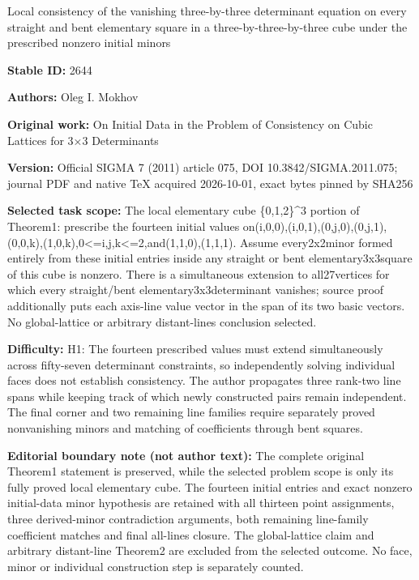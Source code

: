 \documentclass[11pt]{article}
\begin{document}
\begin{center}\Large Local consistency of the vanishing three-by-three determinant equation on every straight and bent elementary square in a three-by-three-by-three cube under the prescribed nonzero initial minors\end{center}
\noindent\textbf{Stable ID:} 2644\par
\noindent\textbf{Authors:} Oleg I. Mokhov\par
\noindent\textbf{Original work:} On Initial Data in the Problem of Consistency on Cubic Lattices for 3×3 Determinants\par
\noindent\textbf{Version:} Official SIGMA 7 (2011) article 075, DOI 10.3842/SIGMA.2011.075; journal PDF and native TeX acquired 2026-10-01, exact bytes pinned by SHA256\par
\noindent\textbf{Selected task scope:} The local elementary cube \{0,1,2\}\textasciicircum{}3 portion of Theorem1: prescribe the fourteen initial values on(i,0,0),(i,0,1),(0,j,0),(0,j,1),(0,0,k),(1,0,k),0<=\allowbreak{}i,j,k<=\allowbreak{}2,and(1,1,0),(1,1,1). Assume every2x2minor formed entirely from these initial entries inside any straight or bent elementary3x3square of this cube is nonzero. There is a simultaneous extension to all27vertices for which every straight/bent elementary3x3determinant vanishes; source proof additionally puts each axis-line value vector in the span of its two basic vectors. No global-lattice or arbitrary distant-lines conclusion selected.\par
\noindent\textbf{Difficulty:} H1: The fourteen prescribed values must extend simultaneously across fifty-seven determinant constraints, so independently solving individual faces does not establish consistency. The author propagates three rank-two line spans while keeping track of which newly constructed pairs remain independent. The final corner and two remaining line families require separately proved nonvanishing minors and matching of coefficients through bent squares.\par
\noindent\textbf{Editorial boundary note (not author text):} The complete original Theorem1 statement is preserved, while the selected problem scope is only its fully proved local elementary cube. The fourteen initial entries and exact nonzero initial-data minor hypothesis are retained with all thirteen point assignments, three derived-minor contradiction arguments, both remaining line-family coefficient matches and final all-lines closure. The global-lattice claim and arbitrary distant-line Theorem2 are excluded from the selected outcome. No face, minor or individual construction step is separately counted.\par
\end{document}
